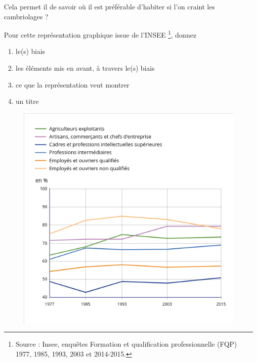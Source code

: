 \documentclass[10pt, a4paper]{article}
\begin{document}
\begin{tcolorbox}[lefttitle=2cm, colframe=gray!75!black, colback=white, title=\textbf{EXERCICE 5 : Analyse de trois datavisualisations de données.}]
\begin{tcolorbox}[lefttitle=2cm, colback=white,colframe=gray!95!black, title=\textbf{EXERCICE 5.2 : Nouvelle analyse}]
Cela permet il de savoir où il est préférable d’habiter si l’on craint
les cambriolages ?
\vspace{2cm}

\end{tcolorbox}






\end{tcolorbox}






\begin{tcolorbox}[lefttitle=2cm, colframe=gray!75!black, colback=white, title=\textbf{EXERCICE 6 : Toujours de l'analyse de représentation}]


Pour cette représentation graphique issue de l'INSEE \footnote{Source : Insee, enquêtes Formation et qualification professionnelle (FQP) 1977, 1985, 1993, 2003 et 2014-2015.}, donnez

\begin{enumerate}
    \item le(s) biais
    \item les éléments mis en avant, à travers le(s) biais
    \item ce que la représentation veut montrer
    \item un titre 
\end{enumerate}
\begin{figure}[H]
    \includegraphics[scale =0.5]{chapitre1/figures/grapheF.png}
    \caption{}
    \label{fig:enter-label}
\end{figure}

\vspace{5cm}
\end{tcolorbox}
\end{document}
